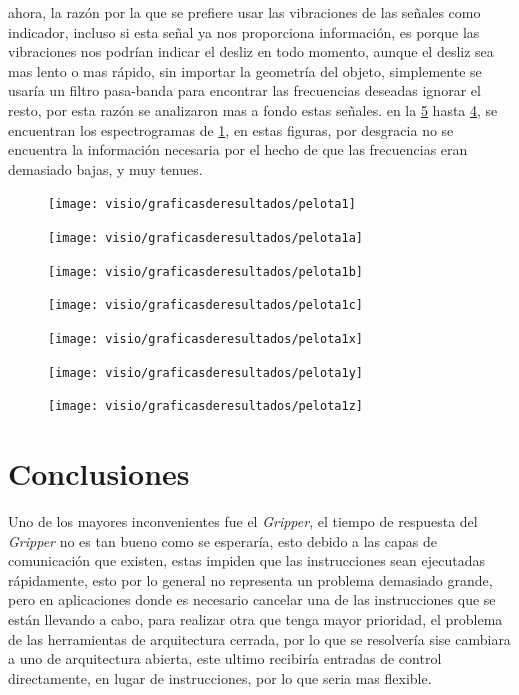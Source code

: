 ahora, la razón por la que se prefiere usar las vibraciones de las señales como indicador, incluso si esta señal ya nos proporciona información, es porque las vibraciones nos podrían indicar el desliz en todo momento, aunque el desliz sea mas lento o mas rápido, sin importar la geometría del objeto, simplemente se usaría un filtro pasa-banda para encontrar las frecuencias deseadas  ignorar el resto, por esta razón se analizaron mas a fondo estas señales.
en  la \cref{fig:pelota1x} hasta \ref{fig:pelota1c}, se encuentran los espectrogramas de \cref{fig:pelota1}, en estas figuras, por desgracia no se encuentra la información necesaria por el hecho de que las frecuencias eran demasiado bajas, y muy tenues.
\begin{figure}
	\centering
	\texttt{[image: visio/graficasderesultados/pelota1]}
	\caption{}
	\label{fig:pelota1}
\end{figure}
\begin{figure}
	\centering
	\texttt{[image: visio/graficasderesultados/pelota1a]}
	\caption{}
	\label{fig:pelota1a}
\end{figure}
\begin{figure}
	\centering
	\texttt{[image: visio/graficasderesultados/pelota1b]}
	\caption{}
	\label{fig:pelota1b}
\end{figure}
\begin{figure}
	\centering
	\texttt{[image: visio/graficasderesultados/pelota1c]}
	\caption{}
	\label{fig:pelota1c}
\end{figure}
\begin{figure}
	\centering
	\texttt{[image: visio/graficasderesultados/pelota1x]}
	\caption{}
	\label{fig:pelota1x}
\end{figure}
\begin{figure}
	\centering
	\texttt{[image: visio/graficasderesultados/pelota1y]}
	\caption{}
	\label{fig:pelota1y}
\end{figure}
\begin{figure}
	\centering
	\texttt{[image: visio/graficasderesultados/pelota1z]}
	\caption{}
	\label{fig:pelota1z}
\end{figure}


\clearpage
\section{Conclusiones}

Uno  de los mayores inconvenientes fue el \textit{Gripper}, el tiempo de respuesta del \textit{Gripper} no es tan bueno como se esperaría, esto debido a las capas de comunicación que existen, estas impiden que las instrucciones sean ejecutadas rápidamente, esto por lo general no representa un problema demasiado grande, pero en aplicaciones donde es necesario cancelar una de las instrucciones que se están llevando a cabo, para realizar otra que tenga mayor prioridad, el problema de las herramientas de arquitectura cerrada, por lo que se resolvería sise cambiara a uno  de arquitectura abierta, este ultimo recibiría entradas de control directamente, en lugar de instrucciones, por lo que seria mas flexible.


